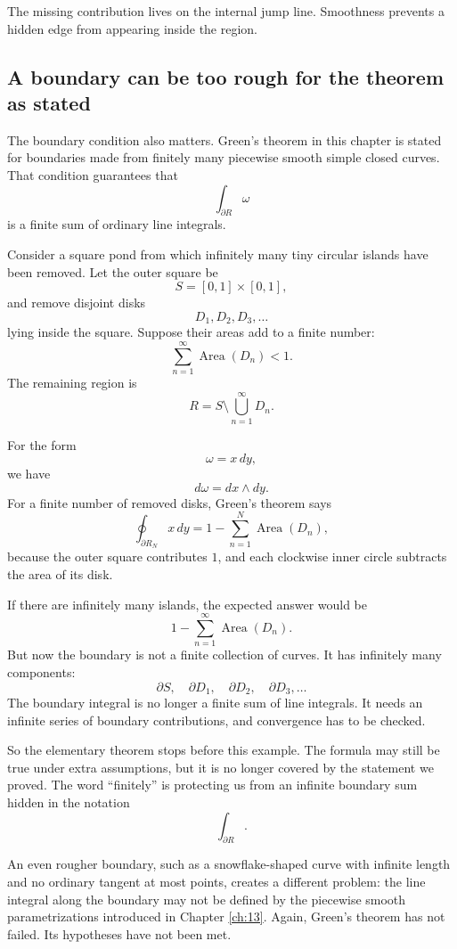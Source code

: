 The missing contribution lives on the internal jump line.  Smoothness prevents a
hidden edge from appearing inside the region.

\subsection{A boundary can be too rough for the theorem as stated}

The boundary condition also matters.  Green's theorem in this chapter is stated for
boundaries made from finitely many piecewise smooth simple closed curves.  That
condition guarantees that
\[
    \int_{\partial R}\omega
\]
is a finite sum of ordinary line integrals.

Consider a square pond from which infinitely many tiny circular islands have been
removed.  Let the outer square be
\[
    S=[0,1]\times[0,1],
\]
and remove disjoint disks
\[
    D_1,D_2,D_3,\ldots
\]
lying inside the square.  Suppose their areas add to a finite number:
\[
    \sum_{n=1}^{\infty}\operatorname{Area}(D_n)<1.
\]
The remaining region is
\[
    R=S\setminus\bigcup_{n=1}^{\infty}D_n.
\]

For the form
\[
    \omega=x\,dy,
\]
we have
\[
    d\omega=dx\wedge dy.
\]
For a finite number of removed disks, Green's theorem says
\[
    \oint_{\partial R_N}x\,dy
    =
    1-\sum_{n=1}^{N}\operatorname{Area}(D_n),
\]
because the outer square contributes \(1\), and each clockwise inner circle subtracts
the area of its disk.

If there are infinitely many islands, the expected answer would be
\[
    1-\sum_{n=1}^{\infty}\operatorname{Area}(D_n).
\]
But now the boundary is not a finite collection of curves.  It has infinitely many
components:
\[
    \partial S,\quad \partial D_1,\quad \partial D_2,\quad \partial D_3,\ldots
\]
The boundary integral is no longer a finite sum of line integrals.  It needs an infinite
series of boundary contributions, and convergence has to be checked.

So the elementary theorem stops before this example.  The formula may still be true
under extra assumptions, but it is no longer covered by the statement we proved.  The
word ``finitely'' is protecting us from an infinite boundary sum hidden in the notation
\[
    \int_{\partial R}.
\]

An even rougher boundary, such as a snowflake-shaped curve with infinite length and
no ordinary tangent at most points, creates a different problem: the line integral along
the boundary may not be defined by the piecewise smooth parametrizations introduced
in Chapter \ref{ch:13}.  Again, Green's theorem has not failed.  Its hypotheses have
not been met.

